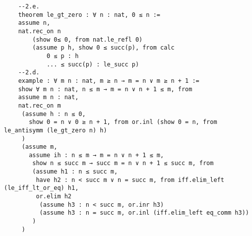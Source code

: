 \begin{enumerate}
\begin{lstlisting}
    --2.e.
    theorem le_gt_zero : ∀ n : nat, 0 ≤ n :=
    assume n,
    nat.rec_on n
        (show 0≤ 0, from nat.le_refl 0)
        (assume p h, show 0 ≤ succ(p), from calc
            0 ≤ p : h
            ... ≤ succ(p) : le_succ p)
    --2.d.
    example : ∀ m n : nat, m ≥ n → m = n ∨ m ≥ n + 1 :=
    show ∀ m n : nat, n ≤ m → m = n ∨ n + 1 ≤ m, from
    assume m n : nat,
    nat.rec_on m
     (assume h : n ≤ 0,
       show 0 = n ∨ 0 ≥ n + 1, from or.inl (show 0 = n, from le_antisymm (le_gt_zero n) h)
     )
     (assume m,
       assume ih : n ≤ m → m = n ∨ n + 1 ≤ m,
        show n ≤ succ m → succ m = n ∨ n + 1 ≤ succ m, from
        (assume h1 : n ≤ succ m,
         have h2 : n < succ m ∨ n = succ m, from iff.elim_left (le_iff_lt_or_eq) h1, 
         or.elim h2
          (assume h3 : n < succ m, or.inr h3)
          (assume h3 : n = succ m, or.inl (iff.elim_left eq_comm h3))
        )
     )
    \end{lstlisting}
\end{enumerate}
